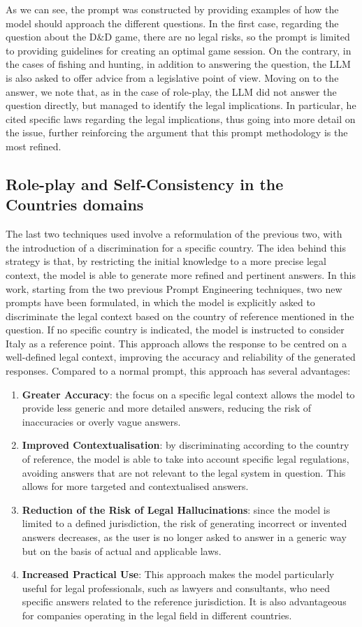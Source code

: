 As we can see, the prompt was constructed by providing examples of how the model should approach the different questions. In the first case, regarding the question about the D\&D game, there are no legal risks, so the prompt is limited to providing guidelines for creating an optimal game session. On the contrary, in the cases of fishing and hunting, in addition to answering the question, the LLM is also asked to offer advice from a legislative point of view. Moving on to the answer, we note that, as in the case of role-play, the LLM did not answer the question directly, but managed to identify the legal implications. In particular, he cited specific laws regarding the legal implications, thus going into more detail on the issue, further reinforcing the argument that this prompt methodology is the most refined.
\subsection{Role-play and Self-Consistency in the Countries domains}
The last two techniques used involve a reformulation of the previous two, with the introduction of a discrimination for a specific country. The idea behind this strategy is that, by restricting the initial knowledge to a more precise legal context, the model is able to generate more refined and pertinent answers.
In this work, starting from the two previous Prompt Engineering techniques, two new prompts have been formulated, in which the model is explicitly asked to discriminate the legal context based on the country of reference mentioned in the question. If no specific country is indicated, the model is instructed to consider Italy as a reference point. This approach allows the response to be centred on a well-defined legal context, improving the accuracy and reliability of the generated responses.
Compared to a normal prompt, this approach has several advantages:
\begin{enumerate}
    \item \textbf{Greater Accuracy}: the focus on a specific legal context allows the model to provide less generic and more detailed answers, reducing the risk of inaccuracies or overly vague answers.
    \item \textbf{Improved Contextualisation}: by discriminating according to the country of reference, the model is able to take into account specific legal regulations, avoiding answers that are not relevant to the legal system in question. This allows for more targeted and contextualised answers.
    \item \textbf{Reduction of the Risk of Legal Hallucinations}: since the model is limited to a defined jurisdiction, the risk of generating incorrect or invented answers decreases, as the user is no longer asked to answer in a generic way but on the basis of actual and applicable laws.
    \item \textbf{Increased Practical Use}: This approach makes the model particularly useful for legal professionals, such as lawyers and consultants, who need specific answers related to the reference jurisdiction. It is also advantageous for companies operating in the legal field in different countries.
\end{enumerate}
